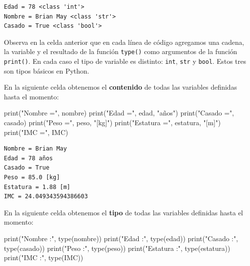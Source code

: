 \documentclass[
  spanish,
  letterpaper,
]{scrbook}
\newenvironment{Shaded}{\begin{snugshade}}{\end{snugshade}}
\newcommand{\BuiltInTok}[1]{\textcolor[rgb]{0.00,0.23,0.31}{#1}}
\newcommand{\NormalTok}[1]{\textcolor[rgb]{0.00,0.23,0.31}{#1}}
\newcommand{\StringTok}[1]{\textcolor[rgb]{0.13,0.47,0.30}{#1}}
\theoremstyle{definition}
\theoremstyle{remark}
\begin{document}
\begin{verbatim}
Edad = 78 <class 'int'>
Nombre = Brian May <class 'str'>
Casado = True <class 'bool'>
\end{verbatim}

Observa en la celda anterior que en cada línea de código agregamos una
cadena, la variable y el resultado de la función \texttt{type()} como
argumentos de la función \texttt{print()}. En cada caso el tipo de
variable es distinto: \texttt{int}, \texttt{str} y \texttt{bool}. Estos
tres son tipos básicos en Python.~

En la siguiente celda obtenemos el \textbf{contenido} de todas las
variables definidas hasta el momento:

\begin{Shaded}
\begin{Highlighting}[]
\BuiltInTok{print}\NormalTok{(}\StringTok{"Nombre ="}\NormalTok{, nombre)}
\BuiltInTok{print}\NormalTok{(}\StringTok{"Edad ="}\NormalTok{, edad, }\StringTok{"años"}\NormalTok{)}
\BuiltInTok{print}\NormalTok{(}\StringTok{"Casado ="}\NormalTok{, casado)}
\BuiltInTok{print}\NormalTok{(}\StringTok{"Peso ="}\NormalTok{, peso, }\StringTok{"[kg]"}\NormalTok{)}
\BuiltInTok{print}\NormalTok{(}\StringTok{"Estatura ="}\NormalTok{, estatura, }\StringTok{"[m]"}\NormalTok{)}
\BuiltInTok{print}\NormalTok{(}\StringTok{"IMC ="}\NormalTok{, IMC)}
\end{Highlighting}
\end{Shaded}

\begin{verbatim}
Nombre = Brian May
Edad = 78 años
Casado = True
Peso = 85.0 [kg]
Estatura = 1.88 [m]
IMC = 24.049343594386603
\end{verbatim}

En la siguiente celda obtenemos el \textbf{tipo} de todas las variables
definidas hasta el momento:

\begin{Shaded}
\begin{Highlighting}[]
\BuiltInTok{print}\NormalTok{(}\StringTok{"Nombre :"}\NormalTok{, }\BuiltInTok{type}\NormalTok{(nombre))}
\BuiltInTok{print}\NormalTok{(}\StringTok{"Edad :"}\NormalTok{, }\BuiltInTok{type}\NormalTok{(edad))}
\BuiltInTok{print}\NormalTok{(}\StringTok{"Casado :"}\NormalTok{, }\BuiltInTok{type}\NormalTok{(casado))}
\BuiltInTok{print}\NormalTok{(}\StringTok{"Peso :"}\NormalTok{, }\BuiltInTok{type}\NormalTok{(peso))}
\BuiltInTok{print}\NormalTok{(}\StringTok{"Estatura :"}\NormalTok{, }\BuiltInTok{type}\NormalTok{(estatura))}
\BuiltInTok{print}\NormalTok{(}\StringTok{"IMC :"}\NormalTok{, }\BuiltInTok{type}\NormalTok{(IMC))}
\end{Highlighting}
\end{Shaded}
\end{document}

